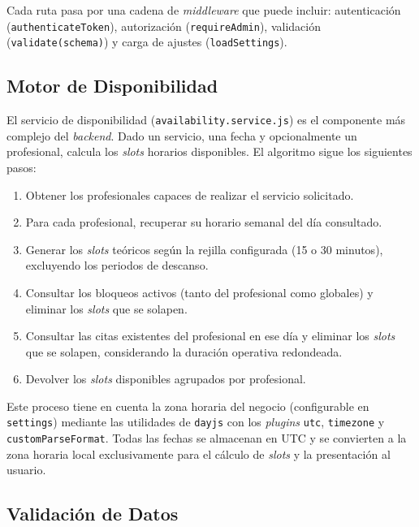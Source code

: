 Cada ruta pasa por una cadena de \textit{middleware} que puede incluir: autenticaci\'on (\texttt{authenticateToken}), autorizaci\'on (\texttt{requireAdmin}), validaci\'on (\texttt{validate(schema)}) y carga de ajustes (\texttt{loadSettings}).

\subsection{Motor de Disponibilidad}\label{subsec:disponibilidad}

El servicio de disponibilidad (\texttt{availability.service.js}) es el componente m\'as complejo del \textit{backend}. Dado un servicio, una fecha y opcionalmente un profesional, calcula los \textit{slots} horarios disponibles. El algoritmo sigue los siguientes pasos:

\begin{enumerate}
    \item Obtener los profesionales capaces de realizar el servicio solicitado.
    \item Para cada profesional, recuperar su horario semanal del d\'ia consultado.
    \item Generar los \textit{slots} te\'oricos seg\'un la rejilla configurada (15 o 30 minutos), excluyendo los periodos de descanso.
    \item Consultar los bloqueos activos (tanto del profesional como globales) y eliminar los \textit{slots} que se solapen.
    \item Consultar las citas existentes del profesional en ese d\'ia y eliminar los \textit{slots} que se solapen, considerando la duraci\'on operativa redondeada.
    \item Devolver los \textit{slots} disponibles agrupados por profesional.
\end{enumerate}

Este proceso tiene en cuenta la zona horaria del negocio (configurable en \texttt{settings}) mediante las utilidades de \texttt{dayjs} con los \textit{plugins} \texttt{utc}, \texttt{timezone} y \texttt{customParseFormat}. Todas las fechas se almacenan en UTC y se convierten a la zona horaria local exclusivamente para el c\'alculo de \textit{slots} y la presentaci\'on al usuario.

\subsection{Validaci\'on de Datos}\label{subsec:validacion}

